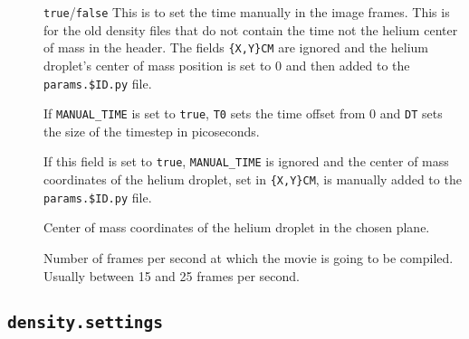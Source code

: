 \documentclass[10pt,a4paper]{article}
\begin{document}
\begin{description}
    \item[] \verb+true+/\verb+false+ This is to set the time manually in the image frames. This is for the old density files that do not contain the time not the helium center of mass in the header. The fields \verb+{X,Y}CM+ are ignored and the helium droplet's center of mass position is set to 0 and then added to the \verb+params.$ID.py+ file.
    \item[] If \verb+MANUAL_TIME+ is set to \verb+true+, \verb+T0+ sets the time offset from 0 and \verb+DT+ sets the size of the timestep in picoseconds.
    \item[] If this field is set to \verb+true+, \verb+MANUAL_TIME+ is ignored and the center of mass coordinates of the helium droplet, set in \verb+{X,Y}CM+, is manually added to the \verb+params.$ID.py+ file.
    \item[] Center of mass coordinates of the helium droplet in the chosen plane.
    \item[] Number of frames per second at which the movie is going to be compiled. Usually between 15 and 25 frames per second. 
\end{description}

\subsection{\protect\Verb+density.settings+}
\end{document}
